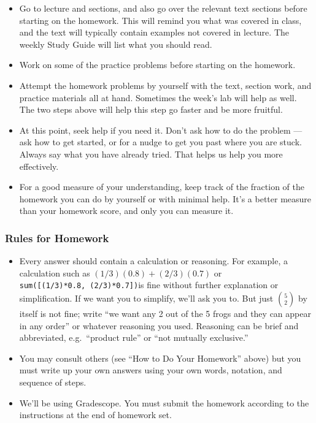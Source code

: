\documentclass[11pt]{article}
\providecommand{\tightlist}{%
      \setlength{\itemsep}{0pt}\setlength{\parskip}{0pt}}
\begin{document}
\begin{itemize}
\tightlist
\item
  Go to lecture and sections, and also go over the relevant text
  sections before starting on the homework. This will remind you what
  was covered in class, and the text will typically contain examples not
  covered in lecture. The weekly Study Guide will list what you should
  read.
\item
  Work on some of the practice problems before starting on the homework.
\item
  Attempt the homework problems by yourself with the text, section work,
  and practice materials all at hand. Sometimes the week's lab will help
  as well. The two steps above will help this step go faster and be more
  fruitful.
\item
  At this point, seek help if you need it. Don't ask how to do the
  problem --- ask how to get started, or for a nudge to get you past
  where you are stuck. Always say what you have already tried. That
  helps us help you more effectively.
\item
  For a good measure of your understanding, keep track of the fraction
  of the homework you can do by yourself or with minimal help. It's a
  better measure than your homework score, and only you can measure it.
\end{itemize}

    \subsubsection{Rules for Homework}\label{rules-for-homework}

\begin{itemize}
\tightlist
\item
  Every answer should contain a calculation or reasoning. For example, a
  calculation such as \((1/3)(0.8) + (2/3)(0.7)\) or
  \texttt{sum({[}(1/3)*0.8,\ (2/3)*0.7{]})}is fine without further
  explanation or simplification. If we want you to simplify, we'll ask
  you to. But just \({5 \choose 2}\) by itself is not fine; write ``we
  want any 2 out of the 5 frogs and they can appear in any order'' or
  whatever reasoning you used. Reasoning can be brief and abbreviated,
  e.g.~``product rule'' or ``not mutually exclusive.''
\item
  You may consult others (see ``How to Do Your Homework'' above) but you
  must write up your own answers using your own words, notation, and
  sequence of steps.
\item
  We'll be using Gradescope. You must submit the homework according to
  the instructions at the end of homework set.
\end{itemize}
\end{document}
